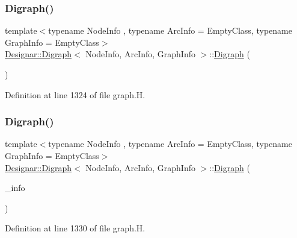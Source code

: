 \subsubsection{\texorpdfstring{Digraph()}{Digraph()}\hspace{0.1cm}{\footnotesize\ttfamily [1/5]}}
{\footnotesize\ttfamily template$<$typename Node\+Info , typename Arc\+Info  = Empty\+Class, typename Graph\+Info  = Empty\+Class$>$ \\
\hyperlink{class_designar_1_1_digraph}{Designar\+::\+Digraph}$<$ Node\+Info, Arc\+Info, Graph\+Info $>$\+::\hyperlink{class_designar_1_1_digraph}{Digraph} (\begin{DoxyParamCaption}{ }\end{DoxyParamCaption})\hspace{0.3cm}{\ttfamily [inline]}}



Definition at line 1324 of file graph.\+H.

\mbox{\label{class_designar_1_1_digraph_ae5210934b3e6e64caceffee62ff1fcad}} 
\subsubsection{\texorpdfstring{Digraph()}{Digraph()}\hspace{0.1cm}{\footnotesize\ttfamily [2/5]}}
{\footnotesize\ttfamily template$<$typename Node\+Info , typename Arc\+Info  = Empty\+Class, typename Graph\+Info  = Empty\+Class$>$ \\
\hyperlink{class_designar_1_1_digraph}{Designar\+::\+Digraph}$<$ Node\+Info, Arc\+Info, Graph\+Info $>$\+::\hyperlink{class_designar_1_1_digraph}{Digraph} (\begin{DoxyParamCaption}\item[{const Graph\+Info \&}]{\+\_\+info }\end{DoxyParamCaption})\hspace{0.3cm}{\ttfamily [inline]}}



Definition at line 1330 of file graph.\+H.

\mbox{\label{class_designar_1_1_digraph_a534b12da4e0aeb32cff655f05e6c91a4}} 
